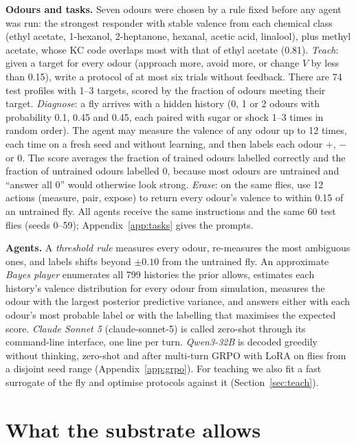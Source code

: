 \documentclass{article}
\begin{document}
\textbf{Odours and tasks.} Seven odours were chosen by a rule fixed before any agent was run: the strongest responder with stable valence from each chemical class (ethyl acetate, 1-hexanol, 2-heptanone, hexanal, acetic acid, linalool), plus methyl acetate, whose KC code overlaps most with that of ethyl acetate (0.81). \emph{Teach}: given a target for every odour (approach more, avoid more, or change $V$ by less than 0.15), write a protocol of at most six trials without feedback. There are 74 test profiles with 1--3 targets, scored by the fraction of odours meeting their target. \emph{Diagnose}: a fly arrives with a hidden history (0, 1 or 2 odours with probability 0.1, 0.45 and 0.45, each paired with sugar or shock 1--3 times in random order). The agent may measure the valence of any odour up to 12 times, each time on a fresh seed and without learning, and then labels each odour $+$, $-$ or $0$. The score averages the fraction of trained odours labelled correctly and the fraction of untrained odours labelled $0$, because most odours are untrained and ``answer all $0$'' would otherwise look strong. \emph{Erase}: on the same flies, use 12 actions (measure, pair, expose) to return every odour's valence to within 0.15 of an untrained fly. All agents receive the same instructions and the same 60 test flies (seeds 0--59); Appendix~\ref{app:tasks} gives the prompts.

\textbf{Agents.} A \emph{threshold rule} measures every odour, re-measures the most ambiguous ones, and labels shifts beyond $\pm0.10$ from the untrained fly. An approximate \emph{Bayes player} enumerates all 799 histories the prior allows, estimates each history's valence distribution for every odour from simulation, measures the odour with the largest posterior predictive variance, and answers either with each odour's most probable label or with the labelling that maximises the expected score. \emph{Claude Sonnet 5} (claude-sonnet-5) is called zero-shot through its command-line interface, one line per turn. \emph{Qwen3-32B} \citep{qwen3} is decoded greedily without thinking, zero-shot and after multi-turn GRPO with LoRA \citep{hu2022} on flies from a disjoint seed range (Appendix~\ref{app:grpo}). For teaching we also fit a fast surrogate of the fly and optimise protocols against it (Section~\ref{sec:teach}).

\section{What the substrate allows}\label{sec:substrate}
\end{document}
